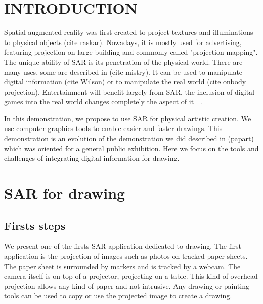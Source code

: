 \documentclass{article}
\begin{document}




\section{INTRODUCTION}

Spatial augmented reality was first created to project textures and illuminations to physical objects (cite raskar). Nowadays, it is mostly used for advertising, featuring projection on large building and commonly called "projection mapping". 
The unique ability of SAR is its penetration of the physical world. There are many uses, some are described in (cite mistry). It can be used to manipulate digital information (cite Wilson) or to manipulate the real world (cite onbody projection). Entertainment will benefit largely from SAR, the inclusion of digital games into the real world changes completely the aspect of it~\cite{wilson2007depth}~\cite{jones2010build}.

In this demonstration, we propose to use SAR for physical artistic creation. We use computer graphics tools to enable easier and faster drawings. This demonstration is an evolution of the demonstration we did described in (papart) which was oriented for a general public exhibition. Here we focus on the tools and challenges of integrating digital information for drawing.  


\section{SAR for drawing}
\subsection{Firsts steps}

We present one of the firsts SAR application dedicated to drawing. The first application is the projection of images such as photos on tracked paper sheets. The paper sheet is surrounded by markers and is tracked by a webcam. The camera itself is on top of a projector, projecting on a table. This kind of overhead projection allows any kind of paper and not intrusive. Any drawing or painting tools can be used to  copy or use the projected image to create a drawing. 
\end{document}
